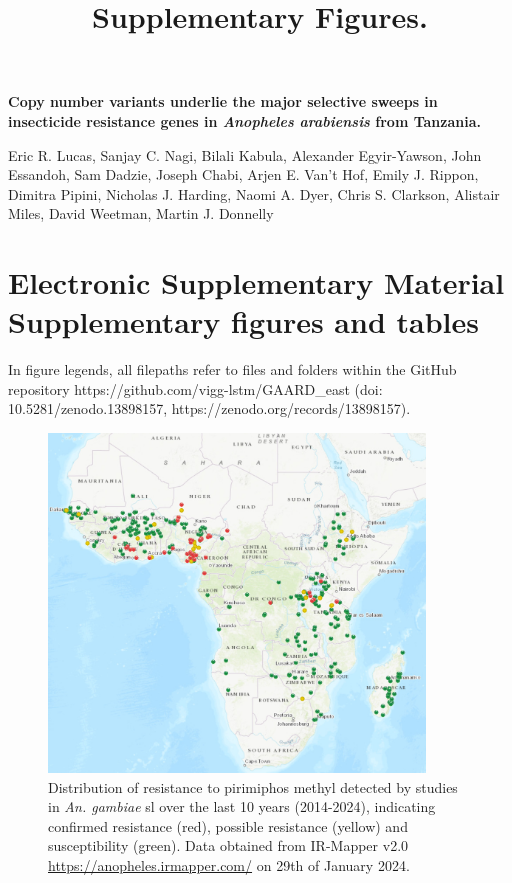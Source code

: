 \documentclass[a4paper,12pt]{article}
\title{Supplementary Figures.}
\begin{document}
\onehalfspacing

\begin{center}
	\Large
	\noindent \textbf{Copy number variants underlie the major selective sweeps in insecticide resistance genes in \textit{Anopheles arabiensis} from Tanzania.}

	\normalsize

	\vskip 3cm

\end{center}

\noindent Eric R. Lucas, Sanjay C. Nagi, Bilali Kabula, Alexander Egyir-Yawson, John Essandoh, Sam Dadzie, Joseph Chabi, Arjen E. Van’t Hof, Emily J. Rippon, Dimitra Pipini, Nicholas J. Harding, Naomi A. Dyer, Chris S. Clarkson, Alistair Miles, David Weetman, Martin J. Donnelly 

 
\vskip 2cm 


\section*{Electronic Supplementary Material \\ Supplementary figures and tables}

In figure legends, all filepaths refer to files and folders within the GitHub repository https://github.com/vigg-lstm/GAARD\_east (doi: 10.5281/zenodo.13898157, \linebreak https://zenodo.org/records/13898157).


\clearpage


\begin{figure}[h]
	\begin{center}
	\vskip 7cm
	\includegraphics*[width = 10cm]{./Anopheles_PM_resistance_map.png}
	\caption{\footnotesize Distribution of resistance to pirimiphos methyl detected by studies in \textit{An. gambiae} sl over the last 10 years (2014-2024), indicating confirmed resistance (red), possible resistance (yellow) and susceptibility (green). Data obtained from IR-Mapper v2.0 \url{https://anopheles.irmapper.com/} on 29th of January 2024.}
	\end{center}
	\label{FigS1}
\end{figure}
\end{document}
